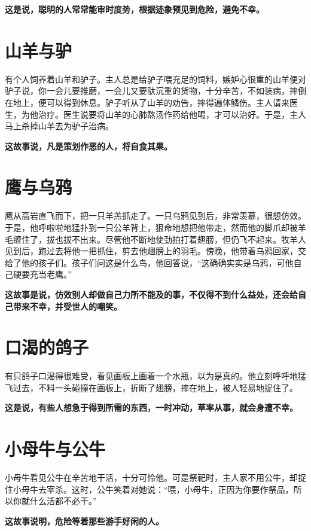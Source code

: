 {\bfseries \color{red}这是说，聪明的人常常能审时度势，根据迹象预见到危险，避免不幸。}

\section{山羊与驴}

有个人饲养着山羊和驴子。主人总是给驴子喂充足的饲料，嫉妒心很重的山羊便对驴子说，你一会儿要推磨，一会儿又要驮沉重的货物，十分辛苦，不如装病，摔倒在地上，便可以得到休息。驴子听从了山羊的劝告，摔得遍体鳞伤。主人请来医生，为他治疗。医生说要将山羊的心肺熬汤作药给他喝，才可以治好。于是，主人马上杀掉山羊去为驴子治病。

{\bfseries \color{red}这故事说，凡是策划作恶的人，将自食其果。}

\section{鹰与乌鸦}

鹰从高岩直飞而下，把一只羊羔抓走了。一只乌鸦见到后，非常羡慕，很想仿效。于是，他呼啦啦地猛扑到一只公羊背上，狠命地想把他带走，然而他的脚爪却被羊毛缠住了，拔也拔不出来。尽管他不断地使劲拍打着翅膀，但仍飞不起来。牧羊人见到后，跑过去将他一把抓住，剪去他翅膀上的羽毛。傍晚，他带着乌鸦回家，交给了他的孩子们。孩子们问这是什么鸟，他回答说，“这确确实实是乌鸦，可他自己硬要充当老鹰。”

{\bfseries \color{red}这故事是说，仿效别人却做自己力所不能及的事，不仅得不到什么益处，还会给自己带来不幸，并受世人的嘲笑。}

\section{口渴的鸽子}

有只鸽子口渴得很难受，看见画板上画着一个水瓶，以为是真的。他立刻呼呼地猛飞过去，不料一头碰撞在画板上，折断了翅膀，摔在地上，被人轻易地捉住了。

{\bfseries \color{red}这是说，有些人想急于得到所需的东西，一时冲动，草率从事，就会身遭不幸。}

\section{小母牛与公牛}

小母牛看见公牛在辛苦地干活，十分可怜他。可是祭祀时，主人家不用公牛，却捉住小母牛去宰杀。这时，公牛笑着对她说：“喂，小母牛，正因为你要作祭品，所以你就什么活都不必干。”

{\bfseries \color{red}这故事说明，危险等着那些游手好闲的人。}

